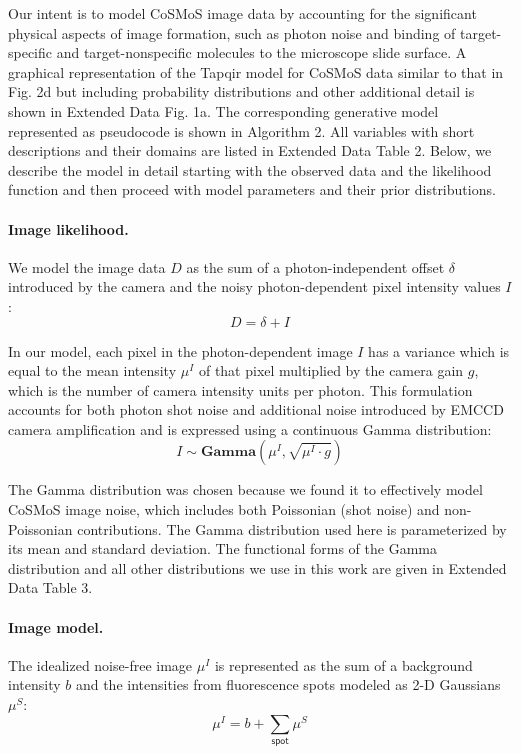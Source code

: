 Our intent is to model CoSMoS image data by accounting for the significant physical aspects of image formation, such as photon noise and binding of target-specific and target-nonspecific molecules to the microscope slide surface. A graphical representation of the Tapqir model for CoSMoS data similar to that in Fig. 2d but including probability distributions and other additional detail is shown in Extended Data Fig. 1a. The corresponding generative model represented as pseudocode is shown in Algorithm 2. All variables with short descriptions and their domains are listed in Extended Data Table 2. Below, we describe the model in detail starting with the observed data and the likelihood function and then proceed with model parameters and their prior distributions.

\paragraph{Image likelihood.} We model the image data $D$ as the sum of a photon-independent offset $\delta$ introduced by the camera and the noisy photon-dependent pixel intensity values $I$:
%
\begin{equation}
    D = \delta + I
\end{equation}

In our model, each pixel in the photon-dependent image $I$ has a  variance which is equal to  the mean intensity $\mu^I$ of that pixel multiplied by the camera gain $g$, which is the number of camera intensity units per photon. This formulation accounts for both photon shot noise and additional noise introduced by EMCCD camera amplification \cite{Van_Vliet1998-jk} and is expressed using a continuous Gamma distribution:
%
\begin{equation}
    I \sim \mathbf{Gamma} (\mu^I, \sqrt{\mu^I \cdot g})
\end{equation}

The Gamma distribution was chosen because we found it to effectively model CoSMoS image noise, which includes both Poissonian (shot noise) and non-Poissonian contributions. The Gamma distribution used here is parameterized by its mean and standard deviation. The functional forms of the Gamma distribution and all other distributions we use in this work are given in Extended Data Table 3.

\paragraph{Image model.} The idealized noise-free image $\mu^I$ is represented  as the sum of a background intensity $b$ and the intensities from fluorescence spots modeled as  2-D Gaussians $\mu^S$:
%
\begin{equation}
    \mu^I = b + \sum_{\mathsf{spot}} \mu^S
\end{equation}

